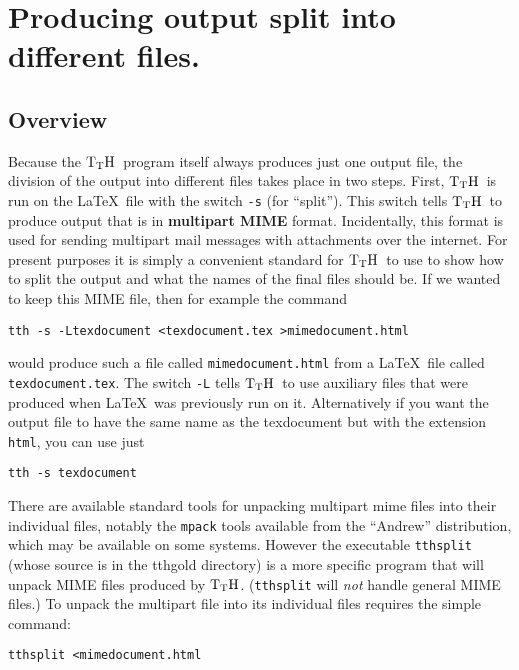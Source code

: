 \documentclass[12pt]{article}
\def\TtH{$\rm{}T_TH$}
\begin{document}

\section{Producing output split into different files.}

\subsection{Overview}

Because the \TtH\ program itself always produces just one output file,
the division of the output into different files takes place in two
steps. First, \TtH\ is run on the \LaTeX\ file with the switch
\verb!-s! (for ``split''). This switch tells \TtH\ to produce output
that is in {\bf multipart MIME} format. Incidentally, this format is
used for sending multipart mail messages with attachments over the
internet. For present purposes it is simply a convenient standard for
\TtH\ to use to show how to split the output and what the names of the
final files should be. If we wanted to keep this MIME file, then for
example the command
\begin{verbatim}
tth -s -Ltexdocument <texdocument.tex >mimedocument.html
\end{verbatim}

\noindent would produce such a file called \verb!mimedocument.html! from a
\LaTeX\ file called \verb!texdocument.tex!. The switch \verb!-L!
tells \TtH\ to use auxiliary files that were produced when \LaTeX\ 
was previously run on it. Alternatively if you want the output file to
have the same name as the texdocument but with the extension
\verb!html!, you can use just
\begin{verbatim}
tth -s texdocument
\end{verbatim}

There are available standard tools for unpacking multipart mime files
into their individual files, notably the \verb!mpack! tools available from
the ``Andrew'' distribution, which may be available on some
systems. However the executable \verb!tthsplit!  (whose source is in
the tthgold directory) is a more specific 
program that will unpack MIME files produced by \TtH. (\verb!tthsplit!
will {\em not} handle general MIME files.) To unpack the multipart
file into its individual files requires the simple command:

\begin{verbatim}
tthsplit <mimedocument.html
\end{verbatim}
\end{document}
